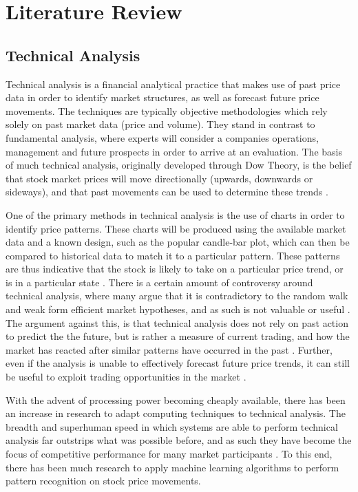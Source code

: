 \documentclass[a4paper,11pt,oneside]{article}
\theoremstyle{plain}
\theoremstyle{definition}
\begin{document}
	
	
	\newpage
	\section{Literature Review}\label{lr_LiteratureReview}
	\subsection{Technical Analysis}\label{lr_TechnicalAnalysis}
	
	Technical analysis is a financial analytical practice that makes use of past price data in order to identify market 
	structures, as well as forecast future price movements. The techniques are typically objective methodologies 
	which rely solely on past market data (price and volume). They stand in contrast to fundamental analysis, where 
	experts will consider a companies operations, management and future prospects in order to arrive at an evaluation. 
	The basis of much technical analysis, originally developed through Dow Theory, is the belief that stock market 
	prices will move directionally (upwards, downwards or sideways), and that past movements can be used to 
	determine these trends \citep{Murphy}.
	\hfill \break 
	
	One of the primary methods in technical analysis is the use of charts in order to identify price patterns. 
	These charts will be produced using the available market data and a known design, such as the popular candle-bar 
	plot, which can then be compared to historical data to match it to a particular pattern. These patterns are thus 
	indicative that the stock is likely to take on a particular price trend, or is in a particular state \citep{Murphy, LoHeretics}.  
	There is a certain amount of controversy around technical analysis, where many argue that it is contradictory 
	to the random walk and weak form efficient market hypotheses, and as such is not valuable or useful \citep{Griffioen}. 
	The argument against this, is that technical analysis does not rely on past action to predict the the future, but is 
	rather a measure of current trading, and how the market has reacted after similar patterns have occurred in the 
	past \citep{Kahn}. Further, even if the analysis is unable to effectively forecast future price trends, it can still be useful 
	to exploit trading opportunities in the market \citep{Schwager}.
	\hfill \break 
	
	With the advent of processing power becoming cheaply available, there has been an increase in research to 
	adapt computing techniques to technical analysis. The breadth and superhuman speed in which systems are 
	able to perform technical analysis far outstrips what was possible before, and as such they have become the 
	focus of competitive performance for many market participants \citep{Johnson}. To this end, there has been much 
	research to apply machine learning algorithms to perform pattern recognition on stock price movements.
	\hfill \break
	
\end{document}
